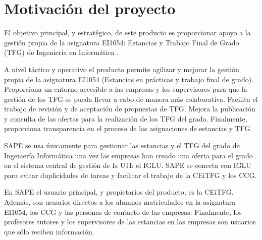 \documentclass[pdftex,11pt,a4paper]{book}
\begin{document}
\section{Motivación del proyecto}

El objetivo principal, y estratégico, de este producto es proporcionar apoyo a la gestión propia de la asignatura EI1054: Estancias y Trabajo Final de Grado (TFG) de Ingeniería en Informática \cite{caspractic}.

A nivel táctico y operativo el producto permite agilizar y mejorar la gestión propia de la asignatura EI1054 (Estancias en prácticas y trabajo final de grado). Proporciona un entorno accesible a las empresas y los supervisores para que la gestión de los TFG se pueda llevar a cabo de manera más colaborativa. Facilita el trabajo de revisión y de aceptación de propuestas de TFG. Mejora la publicación y consulta de las ofertas para la realización de los TFG del grado. Finalmente, proporciona transparencia en el proceso de las asignaciones de estancias y TFG.

SAPE se usa únicamente para gestionar las estancias y el TFG del grado de Ingeniería Informática una vez las empresas han creado una oferta para el grado en el sistema central de gestión de la UJI: el IGLU. SAPE se conecta con IGLU para evitar duplicidades de tareas y facilitar el trabajo de la CEiTFG y los CCG. 

En SAPE el usuario principal, y propietarios del producto, es la CEiTFG. Además, son usuarios directos a los alumnos matriculados en la asignatura EI1054, los CCG y las personas de contacto de las empresas. Finalmente, los profesores tutores y los supervisores de las estancias en las empresas son usuarios que sólo reciben información.
\end{document}
